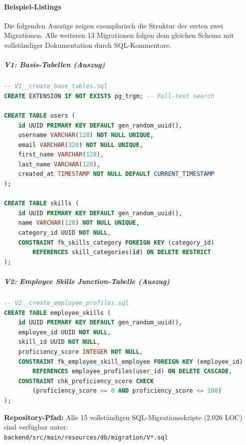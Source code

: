 \paragraph{Beispiel-Listings}

Die folgenden Auszüge zeigen exemplarisch die Struktur der ersten zwei Migrationen. Alle weiteren 13 Migrationen folgen dem gleichen Schema mit vollständiger Dokumentation durch SQL-Kommentare.

\subparagraph{V1: Basis-Tabellen (Auszug)}\mbox{}\vspace{4pt}

\begin{lstlisting}[language=SQL, basicstyle=\scriptsize\ttfamily, frame=single]
-- V1__create_base_tables.sql
CREATE EXTENSION IF NOT EXISTS pg_trgm; -- Full-text search

CREATE TABLE users (
    id UUID PRIMARY KEY DEFAULT gen_random_uuid(),
    username VARCHAR(128) NOT NULL UNIQUE,
    email VARCHAR(320) NOT NULL UNIQUE,
    first_name VARCHAR(128),
    last_name VARCHAR(128),
    created_at TIMESTAMP NOT NULL DEFAULT CURRENT_TIMESTAMP
);

CREATE TABLE skills (
    id UUID PRIMARY KEY DEFAULT gen_random_uuid(),
    name VARCHAR(128) NOT NULL UNIQUE,
    category_id UUID NOT NULL,
    CONSTRAINT fk_skills_category FOREIGN KEY (category_id)
        REFERENCES skill_categories(id) ON DELETE RESTRICT
);
\end{lstlisting}

\subparagraph{V2: Employee Skills Junction-Tabelle (Auszug)}\mbox{}\vspace{4pt}

\begin{lstlisting}[language=SQL, basicstyle=\scriptsize\ttfamily, frame=single]
-- V2__create_employee_profiles.sql
CREATE TABLE employee_skills (
    id UUID PRIMARY KEY DEFAULT gen_random_uuid(),
    employee_id UUID NOT NULL,
    skill_id UUID NOT NULL,
    proficiency_score INTEGER NOT NULL,
    CONSTRAINT fk_employee_skill_employee FOREIGN KEY (employee_id)
        REFERENCES employee_profiles(user_id) ON DELETE CASCADE,
    CONSTRAINT chk_proficiency_score CHECK 
        (proficiency_score >= 0 AND proficiency_score <= 100)
);
\end{lstlisting}

\vspace{1em}

\noindent\textbf{Repository-Pfad:} Alle 15 vollständigen SQL-Migrationsskripte (2.026 LOC) sind verfügbar unter:\\ 
\texttt{backend/src/main/resources/db/migration/V*.sql}

